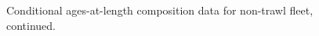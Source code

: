 \documentclass[
]{scrartcl}
\begin{document}
\begin{figure}[H]


\caption{\label{fig-caal_flt3_2}Conditional ages-at-length composition
data for non-trawl fleet, continued.}

\end{figure}%
\end{document}
